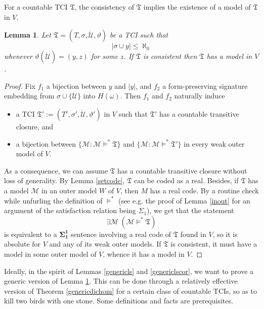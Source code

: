 \documentclass[12pt, twoside]{memoir}
\numberwithin{equation}{section}
\newtheorem{lem}[thm]{Lemma}
\theoremstyle{definition}
\theoremstyle{remark}
\theoremstyle{definition}
\theoremstyle{definition}
\theoremstyle{definition}
\theoremstyle{remark}
\begin{document}
For a countable TCI $\mathfrak{T}$, the consistency of $\mathfrak{T}$ implies the existence of a model of $\mathfrak{T}$ in $V$. 

\begin{lem}\label{modelinV}
Let $\mathfrak{T} = (T, \sigma, \dot{\mathcal{U}}, \vartheta)$ be a TCI such that $$|\sigma \cup y| \leq \aleph_0$$ whenever $\vartheta(\dot{\mathcal{U}}) = (y, z)$ for some $z$. If $\mathfrak{T}$ is consistent then $\mathfrak{T}$ has a model in $V$.
\end{lem}

\begin{proof}
Fix $f_1$ a bijection between $y$ and $|y|$, and $f_2$ a form-preserving signature embedding from $\sigma \cup \{\dot{\mathcal{U}}\}$ into $H(\omega)$. Then $f_1$ and $f_2$ naturally induce
\begin{itemize}
    \item a TCI $\mathfrak{T}' := (T', \sigma', \dot{\mathcal{U}}, \vartheta')$ in $V$ such that $\mathfrak{T}'$ has a countable transitive closure, and
    \item a bijection between $\{\mathcal{M} : \mathcal{M} \models^* \mathfrak{T}\}$ and $\{\mathcal{M} : \mathcal{M} \models^* \mathfrak{T}'\}$ in every weak outer model of $V$.
\end{itemize}
As a consequence, we can assume $\mathfrak{T}$ has a countable transitive closure without loss of generality. By Lemma \ref{setcode}, $\mathfrak{T}$ can be coded as a real. Besides, if $\mathfrak{T}$ has a model $\mathcal{M}$ in an outer model $W$ of $V$, then $M$ has a real code. By a routine check while unfurling the definition of $\models^*$ (see e.g. the proof of Lemma \ref{inout} for an argument of the satisfaction relation being $\Sigma_1$), we get that the statement $$\exists \mathcal{M} \ (\mathcal{M} \models^* \mathfrak{T})$$ is equivalent to a $\mathbf{\Sigma^1_1}$ sentence involving a real code of $\mathfrak{T}$ found in $V$, so it is absolute for $V$ and any of its weak outer models. If $\mathfrak{T}$ is consistent, it must have a model in some outer model of $V$, whence it has a model in $V$.
\end{proof}

Ideally, in the spirit of Lemmas \ref{genericls} and \ref{genericlscor}, we want to prove a generic version of Lemma \ref{modelinV}. This can be done through a relatively effective version of Theorem \ref{genericdichom} for a certain class of countable TCIs, so as to kill two birds with one stone. Some definitions and facts are prerequisites.
\end{document}
